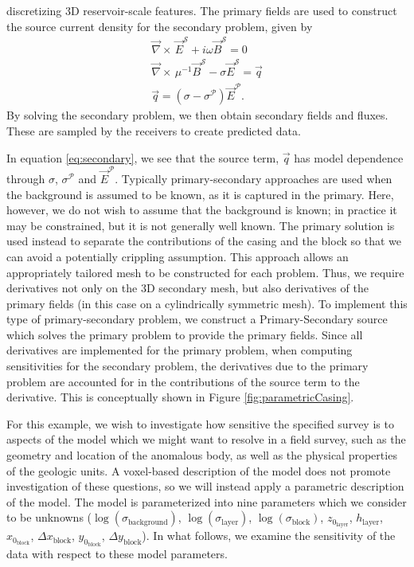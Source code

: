 \documentclass[preprint,review,3p,times,onecolumn,authoryear]{elsarticle}
\newcommand{\curl}{{\vec \nabla}\times\,}
\begin{document}
discretizing 3D reservoir-scale features. The primary fields are used to
construct the source current density for the secondary problem, given by
\begin{equation}
\begin{split}
    \curl \vec{E}^{\mathcal{S}} + i \omega \vec{B}^{\mathcal{S}} = 0 \\
    \curl \mu^{-1}\vec{B}^{\mathcal{S}} - \sigma \vec{E}^{\mathcal{S}} = \vec{q} \\
    \vec{q} =  (\sigma - \sigma^{\mathcal{P}}) \vec{E}^{\mathcal{P}}.
\end{split}
\label{eq:secondary}
\end{equation}
By solving the secondary problem, we then obtain secondary fields and fluxes.
These are sampled by the receivers to create predicted data.

In equation \ref{eq:secondary}, we see that the source term, $\vec{q}$ has
model dependence through $\sigma$, $\sigma^{\mathcal{P}}$ and
$\vec{E}^{\mathcal{P}}$. Typically primary-secondary approaches are used when
the background is assumed to be known, as it is captured in the primary. Here,
however, we do not wish to assume that the background is known; in practice
it may be constrained, but it is not generally well known. The primary solution
is used instead to separate the contributions of the casing and the block
so that we can avoid a potentially crippling assumption. This approach allows
an appropriately tailored mesh to be constructed for each problem. Thus, we
require derivatives not only on the 3D secondary mesh, but also derivatives of
the primary fields (in this case on a cylindrically symmetric mesh). To
implement this type of primary-secondary problem, we construct a
Primary-Secondary source which solves the primary problem to provide the primary
fields. Since all derivatives are implemented for the primary problem, when
computing sensitivities for the secondary problem, the derivatives due to the
primary problem are accounted for in the contributions of the source term to
the derivative. This is conceptually shown in Figure \ref{fig:parametricCasing}.

For this example, we wish to investigate how sensitive the specified survey is
to aspects of the model which we might want to resolve in a field survey, such
as the geometry and location of the anomalous body, as well as the physical
properties of the geologic units. A  voxel-based description of the model does
not promote investigation of these questions, so we will instead apply a
parametric description of the model. The model is parameterized into nine
parameters which we consider to be unknowns
($\log(\sigma_{\text{background}})$, $\log(\sigma_{\text{layer}})$,
$\log(\sigma_{\text{block}})$, $z_{0 _{\text{layer}}}$, $h_{\text{layer}}$,
$x_{0_{\text{block}}}$, $\Delta x_{\text{block}}$, $y_{0_{\text{block}}}$,
$\Delta y_{\text{block}}$). In what follows, we examine the sensitivity of the
data with respect to these model parameters.
\end{document}
